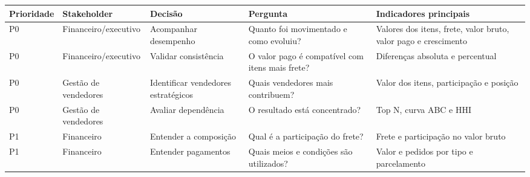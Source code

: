 \documentclass[12pt,a4paper]{article}
\newcounter{none}
\begin{document}
{\def\LTcaptype{none} %
\begin{longtable}[]{@{}
  >{\raggedleft\arraybackslash}p{}
  >{\raggedright\arraybackslash}p{}
  >{\raggedright\arraybackslash}p{}
  >{\raggedright\arraybackslash}p{}
  >{\raggedright\arraybackslash}p{}@{}}
\toprule\noalign{}
\rowcolor{AzulCorporativo}
\begin{minipage}[b]{\linewidth}\raggedleft\color{white}\bfseries
Prioridade
\end{minipage} & \begin{minipage}[b]{\linewidth}\raggedright\color{white}\bfseries
Stakeholder
\end{minipage} & \begin{minipage}[b]{\linewidth}\raggedright\color{white}\bfseries
Decisão
\end{minipage} & \begin{minipage}[b]{\linewidth}\raggedright\color{white}\bfseries
Pergunta
\end{minipage} & \begin{minipage}[b]{\linewidth}\raggedright\color{white}\bfseries
Indicadores principais
\end{minipage} \\
\midrule\noalign{}
\endhead
\bottomrule\noalign{}
\endlastfoot
P0 & Financeiro/\allowbreak executivo & Acompanhar desempenho & Quanto foi
movimentado e como evoluiu? & Valores dos itens, frete, valor bruto,
valor pago e crescimento \\
P0 & Financeiro/\allowbreak executivo & Validar consistência & O valor pago é
compatível com itens mais frete? & Diferenças absoluta e percentual \\
P0 & Gestão de vendedores & Identificar vendedores estratégicos & Quais
vendedores mais contribuem? & Valor dos itens, participação e posição \\
P0 & Gestão de vendedores & Avaliar dependência & O resultado está
concentrado? & Top N, curva ABC e HHI \\
P1 & Financeiro & Entender a composição & Qual é a participação do
frete? & Frete e participação no valor bruto \\
P1 & Financeiro & Entender pagamentos & Quais meios e condições são
utilizados? & Valor e pedidos por tipo e parcelamento \\

\end{longtable}}
\end{document}

